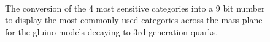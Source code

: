 \newpage
\begin{figure}
  \caption{The conversion of the 4 most sensitive categories into a 9 bit number to display the
  most commonly used categories across the mass plane for the gluino models decaying to 3rd generation quarks.
  \label{fig:jetRanking_gluino}}
  \begin{center}    
     ~~
     \\
  \end{center}
\end{figure}


